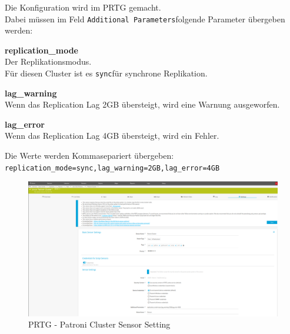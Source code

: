\begin{flushleft}
    Die Konfiguration wird im \Gls{PRTG} gemacht.\\
    Dabei müssen im Feld \guillemotleft\texttt{Additional Parameters}\guillemotright folgende Parameter übergeben werden:
    \begin{description}
        \item \textbf{replication\_mode}\hfill \\Der Replikationsmodus.\\Für diesen Cluster ist es \guillemotleft\texttt{sync}\guillemotright für synchrone Replikation.
        \item \textbf{lag\_warning}\hfill \\Wenn das Replication Lag 2GB übersteigt, wird eine Warnung ausgeworfen.
        \item \textbf{lag\_error}\hfill \\Wenn das Replication Lag 4GB übersteigt, wird ein Fehler.
    \end{description}
    Die Werte werden Kommasepariert übergeben:\\
    \texttt{replication\_mode=sync,lag\_warning=2GB,lag\_error=4GB}
    \begin{figure}[H]
        \centering
        \includegraphics[width=1\linewidth]{source/implementation/construction_implementation/monitoring/patroni_cluster_sensor_setting}
        \caption{\Gls{PRTG} - Patroni Cluster Sensor Setting}
        \label{fig:patroni_cluster_sensor_setting}
    \end{figure}
\end{flushleft}
